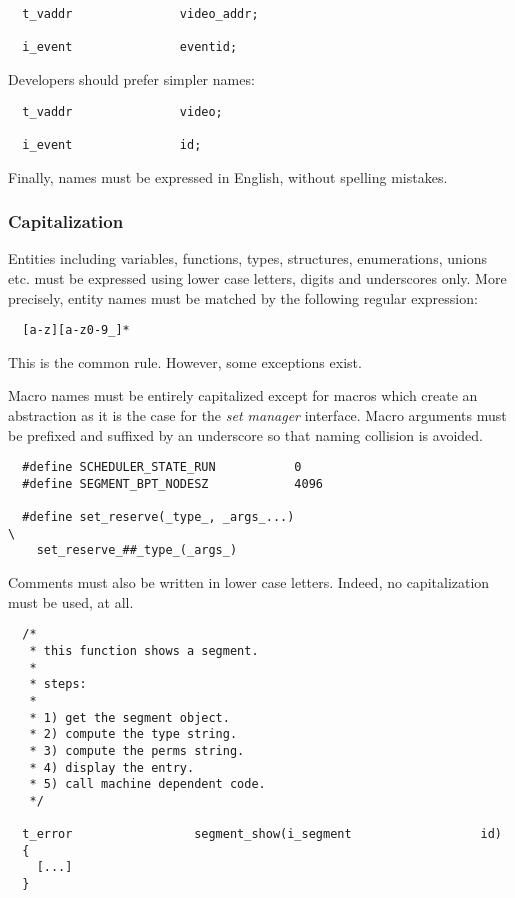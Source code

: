 \begin{verbatim}
  t_vaddr               video_addr;

  i_event               eventid;
\end{verbatim}

Developers should prefer simpler names:

\begin{verbatim}
  t_vaddr               video;

  i_event               id;
\end{verbatim}

Finally, names must be expressed in English, without spelling mistakes.


\subsubsection{Capitalization}

Entities including variables, functions, types, structures, enumerations,
unions etc. must be expressed using lower case letters, digits and underscores
only. More precisely, entity names must be matched by the following
regular expression:

\begin{verbatim}
  [a-z][a-z0-9_]*
\end{verbatim}

This is the common rule. However, some exceptions exist.

Macro names must be entirely capitalized except for macros which create
an abstraction as it is the case for the \textit{set manager} interface. Macro
arguments must be prefixed and suffixed by an underscore so that naming
collision is avoided.

\begin{verbatim}
  #define SCHEDULER_STATE_RUN           0
  #define SEGMENT_BPT_NODESZ            4096

  #define set_reserve(_type_, _args_...)                                \
    set_reserve_##_type_(_args_)
\end{verbatim}

Comments must also be written in lower case letters. Indeed, no capitalization
must be used, at all.

\begin{verbatim}
  /*
   * this function shows a segment.
   *
   * steps:
   *
   * 1) get the segment object.
   * 2) compute the type string.
   * 3) compute the perms string.
   * 4) display the entry.
   * 5) call machine dependent code.
   */

  t_error                 segment_show(i_segment                  id)
  {
    [...]
  }
\end{verbatim}

